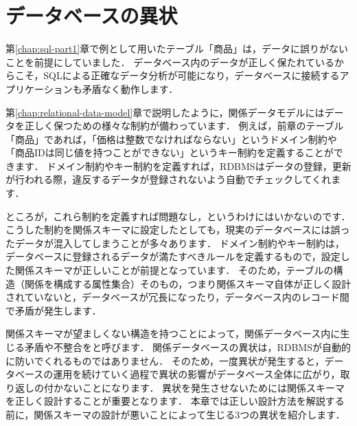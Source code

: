 \chapter{データベースの異状}\label{chap:anomaly}

第\ref{chap:sql-part1}章で例として用いたテーブル「商品」は，データに誤りがないことを前提にしていました．
データベース内のデータが正しく保たれているからこそ，SQLによる正確なデータ分析が可能になり，データベースに接続するアプリケーションも矛盾なく動作します．

第\ref{chap:relational-data-model}章で説明したように，関係データモデルにはデータを正しく保つための様々な制約が備わっています．
例えば，前章のテーブル「商品」であれば，「価格は整数でなければならない」というドメイン制約や「商品IDは同じ値を持つことができない」というキー制約を定義することができます．
ドメイン制約やキー制約を定義すれば，RDBMSはデータの登録，更新が行われる際，違反するデータが登録されないよう自動でチェックしてくれます．

ところが，これら制約を定義すれば問題なし，というわけにはいかないのです．
こうした制約を関係スキーマに設定したとしても，現実のデータベースには誤ったデータが混入してしまうことが多々あります．
ドメイン制約やキー制約は，データベースに登録されるデータが満たすべきルールを定義するもので，設定した関係スキーマが正しいことが前提となっています．
そのため，テーブルの構造（関係を構成する属性集合）そのもの，つまり関係スキーマ自体が正しく設計されていないと，データベースが冗長になったり，データベース内のレコード間で矛盾が発生します．

関係スキーマが望ましくない構造を持つことによって，関係データベース内に生じる矛盾や不整合をと呼びます\cite{Codd1970, Codd1972}．
関係データベースの異状は，RDBMSが自動的に防いでくれるものではありません．
そのため，一度異状が発生すると，データベースの運用を続けていく過程で異状の影響がデータベース全体に広がり，取り返しの付かないことになります．
異状を発生させないためには関係スキーマを正しく設計することが重要となります．
本章では正しい設計方法を解説する前に，関係スキーマの設計が悪いことによって生じる3つの異状を紹介します．




